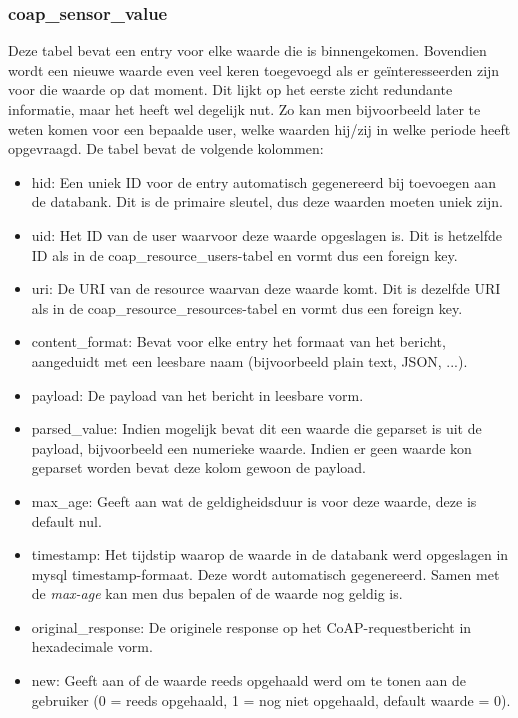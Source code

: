 \subsubsection{coap\_sensor\_value}
Deze tabel bevat een entry voor elke waarde die is binnengekomen. Bovendien wordt een nieuwe waarde even veel keren toegevoegd als er ge\"{i}nteresseerden zijn voor die waarde op dat moment. Dit lijkt op het eerste zicht redundante informatie, maar het heeft wel degelijk nut. Zo kan men bijvoorbeeld later te weten komen voor een bepaalde user, welke waarden hij/zij in welke periode heeft opgevraagd. De tabel bevat de volgende kolommen:
\begin{itemize}
\item hid: Een uniek ID voor de entry automatisch gegenereerd bij toevoegen aan de databank. Dit is de primaire sleutel, dus deze waarden moeten uniek zijn.
\item uid: Het ID van de user waarvoor deze waarde opgeslagen is. Dit is hetzelfde ID als in de coap\_resource\_users-tabel en vormt dus een foreign key.
\item uri: De URI van de resource waarvan deze waarde komt. Dit is dezelfde URI als in de coap\_resource\_resources-tabel en vormt dus een foreign key.
\item content\_format: Bevat voor elke entry het formaat van het bericht, aangeduidt met een leesbare naam (bijvoorbeeld plain text, JSON, ...). 
\item payload: De payload van het bericht in leesbare vorm.
\item parsed\_value: Indien mogelijk bevat dit een waarde die geparset is uit de payload, bijvoorbeeld een numerieke waarde. Indien er geen waarde kon geparset worden bevat deze kolom gewoon de payload.
\item max\_age: Geeft aan wat de geldigheidsduur is voor deze waarde, deze is default nul.
\item timestamp: Het tijdstip waarop de waarde in de databank werd opgeslagen in mysql timestamp-formaat. Deze wordt automatisch gegenereerd. Samen met de \textit{max-age} kan men dus bepalen of de waarde nog geldig is.
\item original\_response: De originele response op het CoAP-requestbericht in hexadecimale vorm.
\item new: Geeft aan of de waarde reeds opgehaald werd om te tonen aan de gebruiker (0 = reeds opgehaald, 1 = nog niet opgehaald, default waarde = 0).
\end{itemize}

